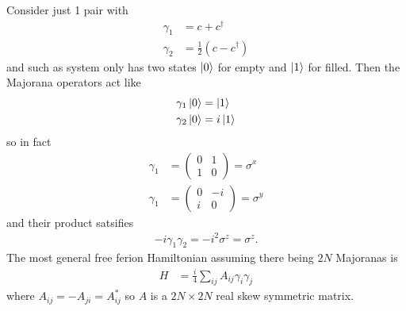 Consider just 1 pair with
\begin{align}
    \gamma_{1} &= c + c^\dagger\\
    \gamma_2 &= \frac{1}{2}\left( c - c^{\dagger} \right)
\end{align}
and such as system only has two states
$\ket{0}$ for empty and $\ket{1}$ for filled.
Then the Majorana operators act like
\begin{align}
    \gamma_1\ket{0} &= \ket{1}\\
    \gamma_2\ket{0} &= i\ket{1}
\end{align}
so in fact
\begin{align}
    \gamma_1 &=
    \begin{pmatrix}
        0 & 1\\
        1 & 0
    \end{pmatrix}
    = \sigma^{x}\\
    \gamma_1 &=
    \begin{pmatrix}
        0 & -i\\
        i & 0
    \end{pmatrix}
    = \sigma^{y}
\end{align}
and their product satsifies
\begin{align}
    -i \gamma_1 \gamma_2 = -i^2 \sigma^z = \sigma^z.
\end{align}
The most general free ferion Hamiltonian assuming there being
$2N$ Majoranas is
\begin{align}
    H &= \frac{i}{4} \sum_{ij} A_{ij} \gamma_i \gamma_j
\end{align}
where $A_{ij} = - A_{ji} = A_{ij}^*$
so $A$ is a $2N\times 2N$ real skew symmetric matrix.

